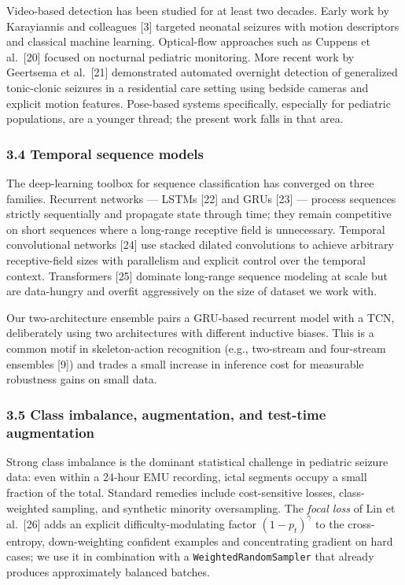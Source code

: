 \documentclass[
  11pt,
]{article}
\begin{document}
Video-based detection has been studied for at least two decades. Early
work by Karayiannis and colleagues {[}3{]} targeted neonatal seizures
with motion descriptors and classical machine learning. Optical-flow
approaches such as Cuppens et al.~{[}20{]} focused on nocturnal
pediatric monitoring. More recent work by Geertsema et al.~{[}21{]}
demonstrated automated overnight detection of generalized tonic-clonic
seizures in a residential care setting using bedside cameras and
explicit motion features. Pose-based systems specifically, especially
for pediatric populations, are a younger thread; the present work falls
in that area.

\subsubsection{3.4 Temporal sequence
models}\label{temporal-sequence-models}

The deep-learning toolbox for sequence classification has converged on
three families. Recurrent networks --- LSTMs {[}22{]} and GRUs {[}23{]}
--- process sequences strictly sequentially and propagate state through
time; they remain competitive on short sequences where a long-range
receptive field is unnecessary. Temporal convolutional networks {[}24{]}
use stacked dilated convolutions to achieve arbitrary receptive-field
sizes with parallelism and explicit control over the temporal context.
Transformers {[}25{]} dominate long-range sequence modeling at scale but
are data-hungry and overfit aggressively on the size of dataset we work
with.

Our two-architecture ensemble pairs a GRU-based recurrent model with a
TCN, deliberately using two architectures with different inductive
biases. This is a common motif in skeleton-action recognition (e.g.,
two-stream and four-stream ensembles {[}9{]}) and trades a small
increase in inference cost for measurable robustness gains on small
data.

\subsubsection{3.5 Class imbalance, augmentation, and test-time
augmentation}\label{class-imbalance-augmentation-and-test-time-augmentation}

Strong class imbalance is the dominant statistical challenge in
pediatric seizure data: even within a 24-hour EMU recording, ictal
segments occupy a small fraction of the total. Standard remedies include
cost-sensitive losses, class-weighted sampling, and synthetic minority
oversampling. The \emph{focal loss} of Lin et al.~{[}26{]} adds an
explicit difficulty-modulating factor \((1 - p_t)^\gamma\) to the
cross-entropy, down-weighting confident examples and concentrating
gradient on hard cases; we use it in combination with a
\texttt{WeightedRandomSampler} that already produces approximately
balanced batches.
\end{document}
